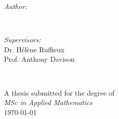 \documentclass[a4paper, 11pt]{report}
\numberwithin{equation}{chapter}
\begin{document}
\begin{titlepage}
\begin{minipage}{0.4\textwidth}
\begin{flushleft} \large
\emph{Author:}\\
\@author %
\end{flushleft}
\end{minipage}
~
\begin{minipage}{0.4\textwidth}
\begin{flushright} \large
\emph{Supervisors:} \\
Dr. Hélène Ruffieux\\
Prof. Anthony Davison 
\end{flushright}
\end{minipage}\\[3cm]
\makeatother



{\large A thesis submitted for the degree of}\\[0.5cm]
{\large \emph{MSc in Applied Mathematics}}\\[0.5cm]
{\large \today}\\[2cm] %

\vfill %

\end{titlepage}
\end{document}
